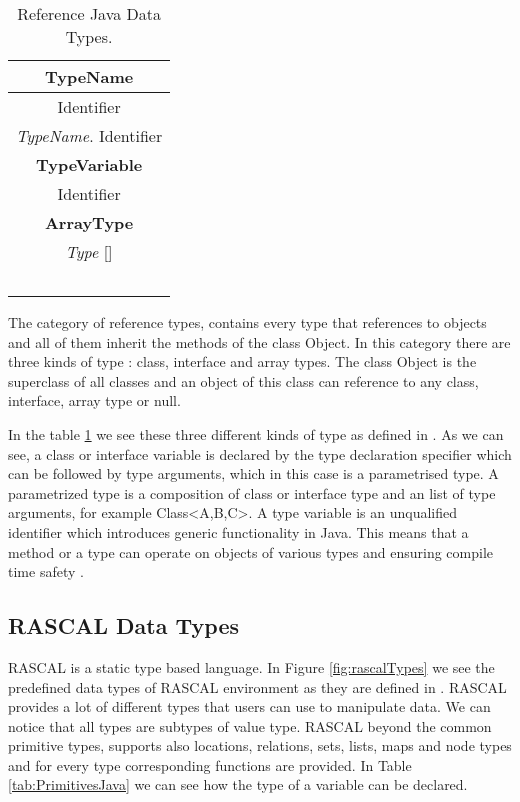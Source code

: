\begin{table}
{\begin{tabular}{c}
    \textbf{TypeName}                             \\ \hline
    Identifier                           \\
    \textit{TypeName}. Identifier                 \\ \hline
    \textbf{TypeVariable}                        \\ \hline
    Identifier                           \\ \hline
    \textbf{ArrayType}                            \\ \hline
    \textit{Type} []                              \\
    ~                                    \\
    \end{tabular}
            \caption{Reference Java Data Types.}
            \label{tab:ReferenceJava}
            }
\end{table}

The category of reference types, contains every type that references to objects and all of them inherit the methods of the class Object. In this category there are three kinds of type : class, interface and array types. The class Object is the superclass of all classes and an object of this class can reference to any class, interface, array type or null. 

 In the table \ref{tab:ReferenceJava} we see these three different kinds of type as defined in \cite{javalangspec}. As we can see, a class or interface variable is declared by the type declaration specifier which can be followed by type arguments, which in this case is a parametrised type. A parametrized type is a composition of class or interface type and an list of type arguments, for example Class<A,B,C>. A type variable is an unqualified identifier which introduces generic functionality in Java. This means that a method or a type can operate on objects of various types and ensuring compile time safety \cite{javakati}. 


\subsection{RASCAL Data Types}

RASCAL is a static type based language. In Figure \ref{fig:rascalTypes} we see the predefined data types of RASCAL environment as they are defined in \cite{rascalstatic}. RASCAL provides a lot of different types that users can use to manipulate data. We can notice that all types are subtypes of value type. RASCAL beyond the common primitive types, supports also locations, relations, sets, lists, maps and node types and for every type corresponding functions are provided. In Table \ref{tab:PrimitivesJava} we can see how the type of a variable can be declared.

